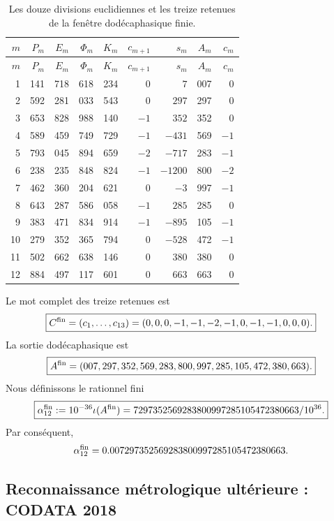 \begingroup
\scriptsize
\setlength{\tabcolsep}{3.2pt}
\begin{longtable}{@{}r|rrrr|r|r|r|r@{}}
\caption{Les douze divisions euclidiennes et les treize retenues de la fenêtre
dodécaphasique finie.}
\label{p12-83-c10-s2:tab:acarreo-alpha-finito-autonomo}\\
\toprule
\(m\)&\(P_m\)&\(E_m\)&\(\Phi_m\)&\(K_m\)&
\(c_{m+1}\)&\(s_m\)&\(A_m\)&\(c_m\)\\
\midrule
\endfirsthead
\toprule
\(m\)&\(P_m\)&\(E_m\)&\(\Phi_m\)&\(K_m\)&
\(c_{m+1}\)&\(s_m\)&\(A_m\)&\(c_m\)\\
\midrule
\endhead
1  &141&718&618&234& \(0\)& \(7\)&007& \(0\)\\
2  &592&281&033&543& \(0\)& \(297\)&297& \(0\)\\
3  &653&828&988&140& \(-1\)& \(352\)&352& \(0\)\\
4  &589&459&749&729& \(-1\)& \(-431\)&569& \(-1\)\\
5  &793&045&894&659& \(-2\)& \(-717\)&283& \(-1\)\\
6  &238&235&848&824& \(-1\)& \(-1200\)&800& \(-2\)\\
7  &462&360&204&621& \(0\)& \(-3\)&997& \(-1\)\\
8  &643&287&586&058& \(-1\)& \(285\)&285& \(0\)\\
9  &383&471&834&914& \(-1\)& \(-895\)&105& \(-1\)\\
10 &279&352&365&794& \(0\)& \(-528\)&472& \(-1\)\\
11 &502&662&638&146& \(0\)& \(380\)&380& \(0\)\\
12 &884&497&117&601& \(0\)& \(663\)&663& \(0\)\\
\bottomrule
\end{longtable}
\endgroup

Le mot complet des treize retenues est
\[
 \boxed{
 C^{\rm fin}
 =(c_1,\ldots,c_{13})
 =(0,0,0,-1,-1,-2,-1,0,-1,-1,0,0,0).}
\]
La sortie dodécaphasique est
\[
 \boxed{
 A^{\rm fin}
 =(007,297,352,569,283,800,997,285,105,472,380,663).}
\]
Nous définissons le rationnel fini
\begin{equation}
 \boxed{
 \alpha_{12}^{\rm fin}
 :=10^{-36}\iota(A^{\rm fin})
 =\frac{7297352569283800997285105472380663}{10^{36}}.}
 \label{p12-83-c10-s2:eq:alpha-finita-autonoma}
\end{equation}
Par conséquent,
\[
 \alpha_{12}^{\rm fin}
 =0.007297352569283800997285105472380663.
\]

\subsection{Reconnaissance métrologique ultérieure : CODATA 2018}

